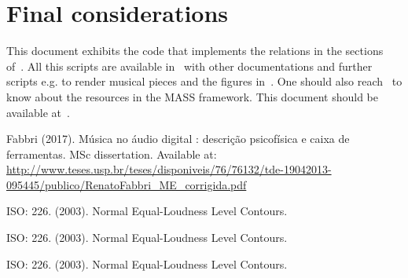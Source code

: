 \documentclass{article}
\begin{document}
\section{Final considerations}
This document exhibits the code that implements the relations
in the sections of~\cite{massArticle}.
All this scripts are available in~\cite{massRepo} with
other documentations and further scripts e.g. to render musical
pieces and the figures in~\cite{massArticle}.
One should also reach~\cite{massListings} to know
about the resources in the MASS framework.
This document should be available at~\cite{massCode}.

\begin{thebibliography}{9}
    Fabbri (2017). M\'usica no \'audio digital : descri\c{c}\~ao psicof\'isica e caixa de ferramentas. MSc dissertation. Available at: \url{http://www.teses.usp.br/teses/disponiveis/76/76132/tde-19042013-095445/publico/RenatoFabbri_ME_corrigida.pdf}

    ISO: 226. (2003). Normal Equal-Loudness Level Contours.

    ISO: 226. (2003). Normal Equal-Loudness Level Contours.

    ISO: 226. (2003). Normal Equal-Loudness Level Contours.
\end{thebibliography}
\end{document}
